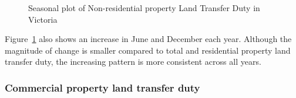 \documentclass[
  11pt,
  a4paper,
]{article}
\begin{document}
\begin{figure}


\caption{\label{fig-nonresspattern}Seasonal plot of Non-residential
property Land Transfer Duty in Victoria}

\end{figure}%

Figure~\ref{fig-nonresspattern} also shows an increase in June and
December each year. Although the magnitude of change is smaller compared
to total and residential property land transfer duty, the increasing
pattern is more consistent across all years.

\subsubsection{Commercial property land transfer
duty}\label{commercial-property-land-transfer-duty}
\end{document}
